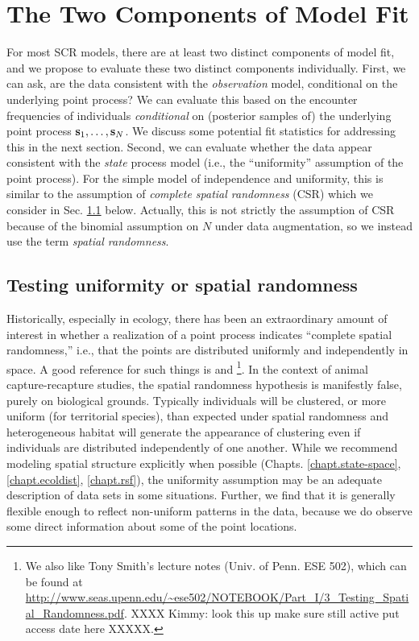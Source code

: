 {\section{The Two Components of Model Fit}

For most SCR models, there are at least two distinct components of
model fit, and we propose to evaluate these two distinct components
individually.  First, we can ask, are the data consistent with the
 {\it
  observation} model, conditional on the underlying point process?
We can evaluate this based on the encounter frequencies of individuals
{\it conditional} on (posterior samples of) the underlying point
process ${\bf s}_{1}, \ldots, {\bf s}_{N}$.  We discuss some potential
fit statistics for addressing this in the next section.  Second, we
can evaluate whether the data appear consistent with the
{\it state} process model (i.e., the ``uniformity'' assumption of 
the point process).  For the simple
model of independence and uniformity, this is similar to the
assumption of {\it complete spatial randomness} (CSR) which we
consider in Sec. \ref{gof.sec.csr} below. Actually, this is not
strictly the assumption of CSR because of the binomial assumption on
$N$ under data augmentation, so we instead use the term {\it spatial
  randomness}.


\subsection{Testing uniformity or spatial randomness}
\label{gof.sec.csr}


Historically, especially in ecology, there has been an extraordinary
amount of interest in whether a realization of a point process
indicates ``complete spatial randomness,'' i.e., that the points are
distributed uniformly and independently in space.  A good reference
for such things is \citet[][Ch. 8]{cressie:1992} and
\citet{illian_etal:2008}\footnote{We also like Tony Smith's lecture
  notes (Univ. of Penn. ESE 502), which can be found at
  \url{http://www.seas.upenn.edu/~ese502/NOTEBOOK/Part_I/3_Testing_Spatial_Randomness.pdf}.
  XXXX
Kimmy: look this up make sure still active put access date here
  XXXXX.  }. In the context of animal capture-recapture studies, the
spatial randomness hypothesis is manifestly false, purely on
biological grounds. Typically individuals will be clustered, or more
uniform (for territorial species), than expected under spatial
randomness and heterogeneous habitat will generate the appearance of
clustering even if individuals are distributed independently of one
another. While we recommend modeling spatial structure explicitly when
possible (Chapts. \ref{chapt.state-space}, \ref{chapt.ecoldist},
\ref{chapt.rsf}), the uniformity assumption may be an adequate
description of data sets in some situations. Further, we find that it
is generally flexible enough to reflect non-uniform patterns in the
data, because we do observe some direct information about some of the point locations.


}
